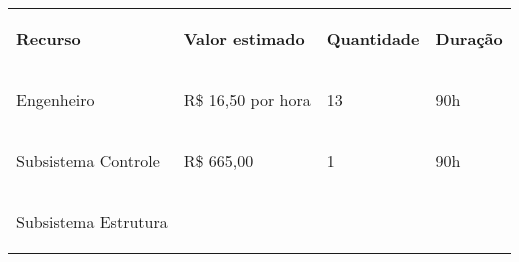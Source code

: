 \begin{apendicesenv}
\begin{table}[h]
 \centering
 {\renewcommand\arraystretch{1.25}
 \begin{tabular}{ l l l l }
  \cline{1-1}\cline{2-2}\cline{3-3}\cline{4-4}  
    \multicolumn{1}{|p{2.367cm}|}{\begin{center}\textbf{Recurso}
\end{center}} &
    \multicolumn{1}{p{2.367cm}|}{\begin{center}\textbf{Valor estimado}
\end{center}} &
    \multicolumn{1}{p{2.367cm}|}{\begin{center}\textbf{Quantidade}
\end{center}} &
    \multicolumn{1}{p{2.367cm}|}{\begin{center}\textbf{Duração}
\end{center}}
  \\  
  \cline{1-1}\cline{2-2}\cline{3-3}\cline{4-4}  
    \multicolumn{1}{|p{2.367cm}|}{\begin{center}Engenheiro
\end{center}} &
    \multicolumn{1}{p{2.367cm}|}{\begin{center}R\$ 16,50 por hora
\end{center}} &
    \multicolumn{1}{p{2.367cm}|}{\begin{center}13
\end{center}} &
    \multicolumn{1}{p{2.367cm}|}{\begin{center}90h
\end{center}}
  \\  
  \cline{1-1}\cline{2-2}\cline{3-3}\cline{4-4}  
    \multicolumn{1}{|p{2.367cm}|}{\begin{center}Subsistema Controle
\end{center}} &
    \multicolumn{1}{p{2.367cm}|}{\begin{center}R\$ 665,00
\end{center}} &
    \multicolumn{1}{p{2.367cm}|}{\begin{center}1
\end{center}} &
    \multicolumn{1}{p{2.367cm}|}{\begin{center}90h
\end{center}}
  \\  
  \cline{1-1}\cline{2-2}\cline{3-3}\cline{4-4}  
    \multicolumn{1}{|p{2.367cm}|}{\begin{center}Subsistema Estrutura
\end{center}} &

\end{tabular}}
\end{table}
\end{apendicesenv}
